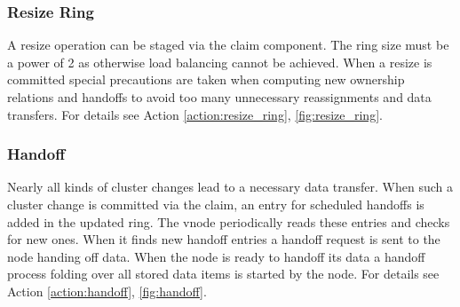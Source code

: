 \subsubsection{Resize Ring}
A resize operation can be staged via the claim component.
The ring size must be a power of 2 as otherwise load balancing cannot be achieved.
When a resize is committed special precautions are taken when computing new ownership relations and handoffs to avoid too many unnecessary reassignments and data transfers.
For details see Action \ref{action:resize_ring}, \cref{fig:resize_ring}.

\subsubsection{Handoff}
Nearly all kinds of cluster changes lead to a necessary data transfer.
When such a cluster change is committed via the claim, an entry for scheduled handoffs is added in the updated ring.
The vnode periodically reads these entries and checks for new ones.
When it finds new handoff entries a handoff request is sent to the node handing off data.
When the node is ready to handoff its data a handoff process folding over all stored data items is started by the node.
For details see Action \ref{action:handoff}, \cref{fig:handoff}.
